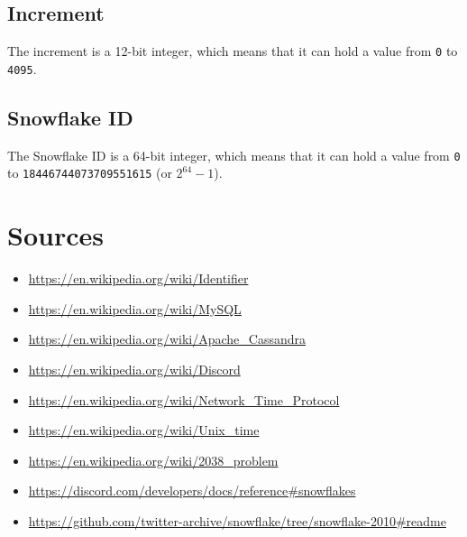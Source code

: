 \documentclass{article}
\newcommand{\code}[1]{\colorbox{cverbbg}{\texttt{#1}}}
\begin{document}
\subsection{Increment}
The increment is a 12-bit integer, which means that it can hold a value from
\code{0} to \code{4095}.

\subsection{Snowflake ID}
\label{snowflake_id_constraints}
The Snowflake ID is a 64-bit integer, which means that it can hold a value from
\code{0} to \code{18446744073709551615} (or $2^{64} - 1$).

\section{Sources}
\begin{small}
    \begin{itemize}
        \item \url{https://en.wikipedia.org/wiki/Identifier}
        \item \url{https://en.wikipedia.org/wiki/MySQL}
        \item \url{https://en.wikipedia.org/wiki/Apache_Cassandra}
        \item \url{https://en.wikipedia.org/wiki/Discord}
        \item \url{https://en.wikipedia.org/wiki/Network_Time_Protocol}
        \item \url{https://en.wikipedia.org/wiki/Unix_time}
        \item \url{https://en.wikipedia.org/wiki/2038_problem}
        \item \url{https://discord.com/developers/docs/reference#snowflakes}
        \item

              \url{https://github.com/twitter-archive/snowflake/tree/snowflake-2010#readme}
    \end{itemize}
\end{small}
\end{document}
